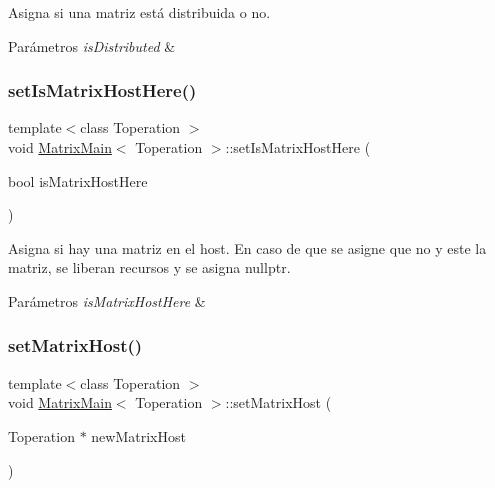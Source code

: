 Asigna si una matriz está distribuida o no. 


\begin{DoxyParams}{Parámetros}
{\em is\+Distributed} & \\
\hline
\end{DoxyParams}
\mbox{\label{classMatrixMain_a6efed0175fedf515e3356ea3c27d3d5a}} 
\subsubsection{\texorpdfstring{set\+Is\+Matrix\+Host\+Here()}{setIsMatrixHostHere()}}
{\footnotesize\ttfamily template$<$class Toperation $>$ \\
void \hyperlink{classMatrixMain}{Matrix\+Main}$<$ Toperation $>$\+::set\+Is\+Matrix\+Host\+Here (\begin{DoxyParamCaption}\item[{bool}]{is\+Matrix\+Host\+Here }\end{DoxyParamCaption})}



Asigna si hay una matriz en el host. En caso de que se asigne que no y este la matriz, se liberan recursos y se asigna nullptr. 


\begin{DoxyParams}{Parámetros}
{\em is\+Matrix\+Host\+Here} & \\
\hline
\end{DoxyParams}
\mbox{\label{classMatrixMain_a1cbc27697a76770978dde0e4b0edc732}} 
\subsubsection{\texorpdfstring{set\+Matrix\+Host()}{setMatrixHost()}}
{\footnotesize\ttfamily template$<$class Toperation $>$ \\
void \hyperlink{classMatrixMain}{Matrix\+Main}$<$ Toperation $>$\+::set\+Matrix\+Host (\begin{DoxyParamCaption}\item[{Toperation $\ast$}]{new\+Matrix\+Host }\end{DoxyParamCaption})}



